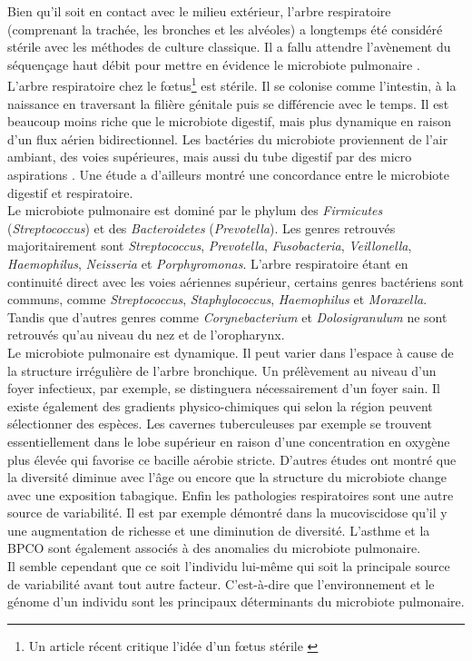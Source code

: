 \documentclass[12pt,a4paper]{article}
\begin{document}
Bien qu'il soit en contact avec le milieu extérieur, l’arbre respiratoire (comprenant la trachée, les bronches et les alvéoles) a longtemps été considéré stérile avec les méthodes de culture classique. Il a fallu attendre l’avènement du séquençage haut débit pour mettre en évidence le microbiote pulmonaire \cite{HoMan2017,Beck,Dicksonb}.\\
L'arbre respiratoire chez le fœtus\footnote{Un article récent critique l'idée d'un fœtus stérile \cite{Perez-Munoz2017}} est stérile. Il se colonise comme l'intestin, à la naissance en traversant la filière génitale puis se différencie avec le temps. Il est beaucoup moins riche que le microbiote digestif, mais plus dynamique en raison d'un flux aérien bidirectionnel.  Les bactéries du microbiote proviennent de l’air ambiant, des voies supérieures,  mais aussi du tube digestif par des micro aspirations \cite{Dickson}. Une étude a d'ailleurs montré une concordance entre le microbiote digestif et respiratoire\cite{Dickson}.\\
Le microbiote pulmonaire est dominé par le phylum des \textit{Firmicutes} (\textit{Streptococcus}) et des \textit{Bacteroidetes} (\textit{Prevotella}). Les genres retrouvés majoritairement sont \textit{Streptococcus}, \textit{Prevotella}, \textit{Fusobacteria}, \textit{Veillonella}, \textit{Haemophilus}, \textit{Neisseria} et \textit{Porphyromonas}.
L’arbre respiratoire étant en continuité direct avec les voies aériennes supérieur, certains genres bactériens sont communs, comme \textit{Streptococcus}, \textit{Staphylococcus}, \textit{Haemophilus} et \textit{Moraxella}. Tandis que d’autres genres comme \textit{Corynebacterium} et \textit{Dolosigranulum} ne sont retrouvés qu’au niveau du nez et de l'oropharynx. \\
Le microbiote pulmonaire est dynamique. Il peut varier dans l'espace à cause de la structure irrégulière de l'arbre bronchique. Un prélèvement au niveau d'un foyer infectieux, par exemple, se distinguera nécessairement d'un foyer sain. Il existe également des gradients physico-chimiques qui selon la région peuvent sélectionner des espèces. Les cavernes tuberculeuses par exemple se trouvent essentiellement dans le lobe supérieur en raison d'une concentration en oxygène plus élevée qui favorise ce bacille aérobie stricte. D'autres études \cite{Frayman2017,Coburn2015} ont montré que la diversité diminue avec l'âge ou encore que la structure du microbiote change avec une exposition tabagique.
Enfin les pathologies respiratoires\cite{HoMan2017} sont une autre source de variabilité. Il est par exemple démontré dans la mucoviscidose qu'il y une augmentation de richesse et une diminution de diversité. L'asthme et la BPCO sont également associés à des anomalies du microbiote pulmonaire\cite{Dicksona,Nguyen2015}.  \\
Il semble cependant que ce soit l'individu lui-même qui soit la principale source de variabilité avant tout autre facteur\cite{Whelan2017}. C'est-à-dire que l'environnement et le génome d'un individu sont les principaux déterminants du microbiote pulmonaire.
\end{document}
